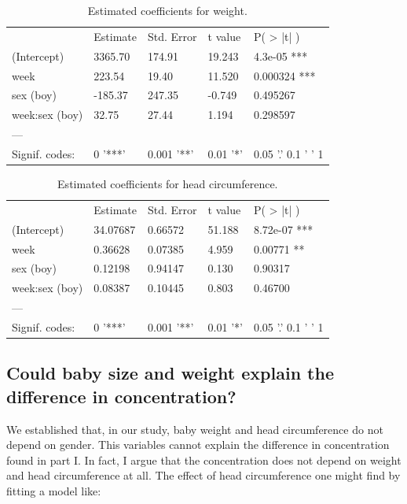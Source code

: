 \documentclass[12pt]{article}
\begin{document}
\begin{table}[!htb]
\begin{tabular}{lllll}
 & Estimate & Std. Error & t value & P\left( > |t| \right) \\
(Intercept) & 3365.70 & 174.91 & 19.243 & 4.3e-05 *** \\
week & 223.54 & 19.40 & 11.520 & 0.000324 *** \\
sex (boy) & -185.37 & 247.35 & -0.749 & 0.495267 \\
week:sex (boy) & 32.75 & 27.44 & 1.194 & 0.298597 \\
--- &  &  &  &  \\
Signif. codes: & 0 '***' & 0.001 '**' & 0.01 '*' & 0.05 '.' 0.1 ' ' 1
\end{tabular}
\caption{Estimated coefficients for weight.}
\label{tab:weight}
\end{table}

\begin{table}[!htb]
\begin{tabular}{lllll}
 & Estimate & Std. Error & t value & P\left( > |t| \right)\\
(Intercept) & 34.07687 & 0.66572 & 51.188 & 8.72e-07 *** \\
week & 0.36628 & 0.07385 & 4.959 & 0.00771 ** \\
sex (boy) & 0.12198 & 0.94147 & 0.130 & 0.90317 \\
week:sex (boy) & 0.08387 & 0.10445 & 0.803 & 0.46700 \\
--- &  &  &  &  \\
Signif. codes: & 0 '***' & 0.001 '**' & 0.01 '*' & 0.05 '.' 0.1 ' ' 1
\end{tabular}
\caption{Estimated coefficients for head circumference.}
\label{tab:head_c}
\end{table}

\clearpage

\subsection{Could baby size and weight explain the difference in concentration?}

We established that, in our study, baby weight and head circumference do not depend on gender. This variables cannot explain the difference in concentration found in part I. In fact, I argue that the concentration does not depend on weight and head circumference at all. The effect of head circumference one might find by fitting a model like:
\end{document}
